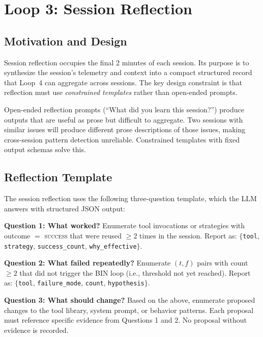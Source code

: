 \section{Loop 3: Session Reflection}

\label{sec:loop3}

\subsection{Motivation and Design}

Session reflection occupies the final 2 minutes of each session. Its purpose
is to synthesize the session's telemetry and context into a compact structured
record that Loop~4 can aggregate across sessions. The key design constraint is
that reflection must use \emph{constrained templates} rather than open-ended
prompts.

Open-ended reflection prompts (``What did you learn this session?'') produce
outputs that are useful as prose but difficult to aggregate. Two sessions with
similar issues will produce different prose descriptions of those issues,
making cross-session pattern detection unreliable. Constrained templates with
fixed output schemas solve this.

\subsection{Reflection Template}

The session reflection uses the following three-question template, which
the LLM answers with structured JSON output:

\vspace{0.5em}
\noindent\textbf{Question 1: What worked?}
Enumerate tool invocations or strategies with outcome $=$ \textsc{success}
that were reused $\geq 2$ times in the session. Report as:
$\{$\texttt{tool}, \texttt{strategy}, \texttt{success\_count}, \texttt{why\_effective}$\}$.

\noindent\textbf{Question 2: What failed repeatedly?}
Enumerate $(t, f)$ pairs with count $\geq 2$ that did not trigger the BIN
loop (i.e., threshold not yet reached). Report as:
$\{$\texttt{tool}, \texttt{failure\_mode}, \texttt{count}, \texttt{hypothesis}$\}$.

\noindent\textbf{Question 3: What should change?}
Based on the above, enumerate proposed changes to the tool library, system
prompt, or behavior patterns. Each proposal must reference specific evidence
from Questions 1 and 2. No proposal without evidence is recorded.

